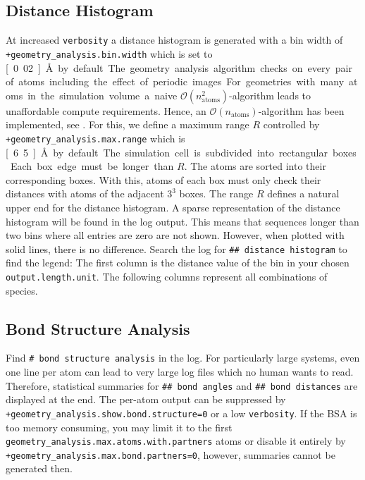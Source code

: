 \documentclass[oribibl]{llncs}
\newcommand{\um}[1]{_{\mathrm{#1}}}
\newcommand{\ttt}[1]{\texttt{#1}}
\begin{document}
\subsection{Distance Histogram} \label{sec:distance-histogram}
%
At increased \ttt{verbosity} a distance histogram is generated with
a bin width of \ttt{+geometry\_analysis.bin.width} which is set to \unit[0.02]{\AA} by default.
The geometry analysis algorithm checks on every pair of atoms
including the effect of periodic images.
For geometries with many atoms in the simulation volume
a naive $\mathcal O(n\um{atoms}^2)$-algorithm 
leads to unaffordable compute requirements.
Hence, an $\mathcal O(n\um{atoms})$-algorithm has been implemented, see \cite{a43theory}.
For this, we define a maximum range $R$ controlled 
by \ttt{+geometry\_analysis.max.range} which is \unit[6.5]{\AA} by default.
The simulation cell is subdivided into rectangular boxes. 
Each box edge must be longer than $R$. 
The atoms are sorted into their corresponding boxes.
With this, atoms of each box must only check their distances 
with atoms of the adjacent $3^3$ boxes.
The range $R$ defines a natural upper end for the distance histogram.
A sparse representation of the distance histogram will be found in the log output.
This means that sequences longer than two bins where all entries are zero are not shown.
However, when plotted with solid lines, there is no difference.
Search the log for \ttt{\#\# distance histogram} to find the legend:
The first column is the distance value of the bin in your chosen \ttt{output.length.unit}.
The following columns represent all combinations of species.

\subsection{Bond Structure Analysis} \label{sec:bond-structure-analysis}
%
Find \ttt{\# bond structure analysis} in the log.
For particularly large systems, even one line per atom
can lead to very large log files which no human wants to read.
Therefore, statistical summaries 
for \ttt{\#\# bond angles} 
and \ttt{\#\# bond distances} are displayed at the end.
The per-atom output can be suppressed
by \ttt{+geometry\_analysis.show.bond.structure=0} or a low \ttt{verbosity}.
If the BSA is too memory consuming, you may limit it 
to the first \ttt{geometry\_analysis.max.atoms.with.partners} atoms 
or disable it entirely by \ttt{+geometry\_analysis.max.bond.partners=0},
however, summaries cannot be generated then.
\end{document}
